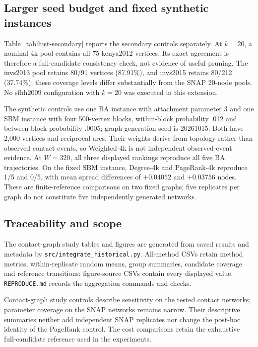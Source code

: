 \subsection{Larger seed budget and fixed synthetic instances}
Table~\ref{tab:hist-secondary} reports the secondary controls separately. At
$k=20$, a nominal 4k pool contains all 75 kenya2012 vertices. Its exact agreement
is therefore a full-candidate consistency check, not evidence of useful pruning.
The invs2013 pool retains 80/91 vertices (87.91\%), and invs2015 retains 80/212
(37.74\%); these coverage levels differ substantially from the SNAP 20-node
pools. No sfhh2009 configuration with $k=20$ was executed in this extension.

The synthetic controls use one BA instance with attachment parameter 3 and one
SBM instance with four 500-vertex blocks, within-block probability .012 and
between-block probability .0005; graph-generation seed is 20261015. Both have
2,000 vertices and reciprocal arcs. Their weights derive from topology rather
than observed contact events, so Weighted-4k is not independent observed-event
evidence. At $W=320$, all three displayed rankings reproduce all five BA
trajectories. On the fixed SBM instance, Degree-4k and PageRank-4k reproduce 1/5
and 0/5, with mean spread differences of $+0.04052$ and $+0.03756$ nodes. These
are finite-reference comparisons on two fixed graphs; five replicates per graph do
not constitute five independently generated networks.


\subsection{Traceability and scope}
The contact-graph study tables and figures are generated from saved results and metadata
by \texttt{src/integrate\_historical.py}. All-method CSVs retain method metrics,
within-replicate random means, group summaries, candidate coverage and reference
transitions; figure-source CSVs contain every displayed value.
\texttt{REPRODUCE.md} records the aggregation commands and checks.

Contact-graph study controls describe sensitivity on the tested contact networks;
parameter coverage on the SNAP networks remains narrow. Their descriptive
summaries neither add independent SNAP replicates nor change the post-hoc
identity of the PageRank control. The cost comparisons retain the exhaustive
full-candidate reference used in the experiments.
